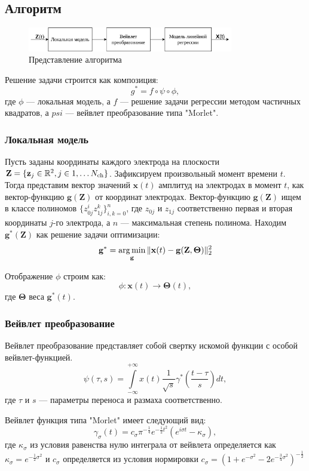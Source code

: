 \documentclass[12pt, twoside]{article}
\begin{document}
\subsection{Алгоритм}
\begin{figure}[h!]
	\centering
	\includegraphics[width=0.8\textwidth]{../figs/algo.pdf}
	\caption{Представление алгоритма}
\end{figure}
Решение задачи строится как композиция:
\[
	g^* =  f \circ \psi \circ \phi,
\]
где $\phi$ --- локальная модель, а $f$ --- решение задачи регрессии методом частичных квадратов, а $psi$ --- вейвлет преобразование типа "Morlet".
\subsubsection{Локальная модель}
Пусть заданы координаты каждого электрода на плоскости $\mathbf{Z} = \{\mathbf{z}_j \in \mathbb{R}^2, j \in {1, \ldots N_\text{ch}} \}$. Зафиксируем произвольный момент времени $t$. Тогда представим вектор значений $\mathbf{x}(t)$ амплитуд на электродах в момент $t$, как вектор-функцию $\mathbf{g}(\mathbf{Z})$ от координат электродах. Вектор-функцию $\mathbf{g}(\mathbf{Z})$ ищем в классе полиномов $\{z_{0j}^iz_{1j}^k\}_{i,k = 0}^{n}$, где $z_{0j}$ и $z_{1j}$ соответственно первая и вторая координаты $j$-го электрода, а $n$ --- максимальная степень полинома. Находим $\mathbf{g^*}(\mathbf{Z})$ как решение задачи оптимизации:
\[
\mathbf{g^*} = \argmin_{\mathbf{g}} \|\mathbf{x}(t) - \mathbf{g}(\mathbf{Z}, \mathbf{\Theta})\|_2^2
\]

Отображение $\phi$ строим как: 
\[
	\phi: \mathbf{x}(t) \rightarrow \pmb{\Theta}(t), 
\] где $\pmb{\Theta}$ веса $\mathbf{g^*}(t).$
\subsubsection{Вейвлет преобразование}
Вейвлет преобразование \cite{grossmann1984decomposition} представляет собой свертку искомой функции с особой вейвлет-функцией.
\[
\psi (\tau ,s)=\int \limits _{{-\infty }}^{{+\infty }}x(t){\frac  {1}{{\sqrt  {s}}}}\gamma ^{{*}}\left({\frac  {t-\tau }{s}}\right)dt,
\]
где $\tau$ и $s$ --- параметры переноса и размаха соответственно.

Вейвлет функция типа "Morlet" имеет следующий вид:
\[
\gamma _{\sigma }(t)=c_{\sigma }\pi ^{-{\frac {1}{4}}}e^{-{\frac {1}{2}}t^{2}}(e^{i\sigma t}-\kappa _{\sigma }),
\]
где $\kappa_{\sigma}$  из условия равенства нулю интеграла от вейвлета определяется как
$\kappa_{\sigma}=e^{-\frac{1}{2}\sigma^{2}}$ и $c_{\sigma}$ определяется из условия нормировки $c_{\sigma}=\left(1+e^{-\sigma^{2}}-2e^{-\frac{3}{4}\sigma^{2}}\right)^{-\frac{1}{2}}$
\end{document}
